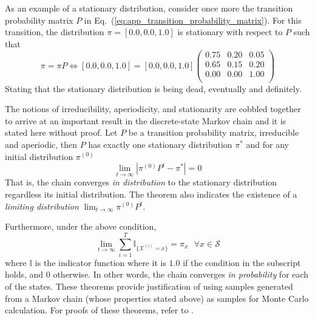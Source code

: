 As an example of a stationary distribution, consider once more the transition probability matrix $P$ in Eq.~(\ref{eq:app_transition_probability_matrix}).
For this transition, the distribution $\pi = [0.0, 0.0, 1.0]$ is stationary with respect to $P$ such that
\begin{equation}
	\pi = \pi P \Leftrightarrow [0.0, 0.0, 1.0] = [0.0, 0.0, 1.0] 		\begin{pmatrix}
		  0.75  & 0.20 & 0.05\\
      0.65  & 0.15 & 0.20\\
      0.00  & 0.00 & 1.00\\
		\end{pmatrix}
\label{eq:app_markov_chain_stationary_example}
\end{equation}
Stating that the stationary distribution is being dead, eventually and definitely.

The notions of irreducibility, aperiodicity, and stationarity are cobbled together to arrive at an important result in the discrete-state Markov chain and it is stated here without proof.
Let $P$ be a transition probability matrix, irreducible and aperiodic, then $P$ has exactly one stationary distribution $\pi^*$ and for any initial distribution $\pi^{(0)}$
\begin{equation}
	\lim_{t \rightarrow \infty} |\pi^{(0)}P^t - \pi^*| = 0
\label{eq:app_markov_chain_convergence}
\end{equation}
That is, the chain converges \emph{in distribution} to the stationary distribution regardless its initial distribution.
The theorem also indicates the existence of a \emph{limiting distribution} $\lim_{t \rightarrow \infty} \pi^{(0)}P^t$.

Furthermore, under the above condition,
\begin{equation}
	\lim_{t \rightarrow \infty} \sum_{i=1}^{T} \mathbb{I}_{\{\mathcal{X}^{(i)} = x\}} = \pi_{x} \,\,\,\, \forall x \in \mathcal{S}
\label{eq:app_markov_chain_ergodic_theorem}
\end{equation}
where $\mathbb{I}$ is the indicator function where it is $1.0$ if the condition in the subscript holds, and $0$ otherwise.
In other words, the chain converges \emph{in probability} for each of the states.
These theorems provide justification of using samples generated from a Markov chain (whose properties stated above) as samples for Monte Carlo calculation.
For proofs of these theorems, refer to \cite{Robert2004}.


